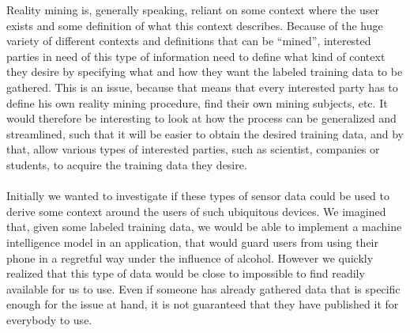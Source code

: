 Reality mining is, generally speaking, reliant on some context where the user exists and some definition of what this context describes. Because of the huge variety of different contexts and definitions that can be ``mined'', interested parties in need of this type of information need to define what kind of context they desire by specifying what and how they want the labeled training data to be gathered. This is an issue, because that means that every interested party has to define his own reality mining procedure, find their own mining subjects, etc. It would therefore be interesting to look at how the process can be generalized and streamlined, such that it will be easier to obtain the desired training data, and by that, allow various types of interested parties, such as scientist, companies or students, to acquire the training data they desire.
\\\\
Initially we wanted to investigate if these types of sensor data could be used to derive some context around the users of such ubiquitous devices. We imagined that, given some labeled training data, we would be able to implement a machine intelligence model in an application, that would guard users from using their phone in a regretful way under the influence of alcohol. However we quickly realized that this type of data would be close to impossible to find readily available for us to use. Even if someone has already gathered data that is specific enough for the issue at hand, it is not guaranteed that they have published it for everybody to use.

